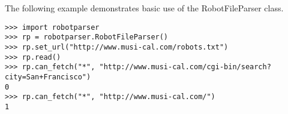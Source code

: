 The following example demonstrates basic use of the RobotFileParser class.

\begin{verbatim}
>>> import robotparser
>>> rp = robotparser.RobotFileParser()
>>> rp.set_url("http://www.musi-cal.com/robots.txt")
>>> rp.read()
>>> rp.can_fetch("*", "http://www.musi-cal.com/cgi-bin/search?city=San+Francisco")
0
>>> rp.can_fetch("*", "http://www.musi-cal.com/")
1
\end{verbatim}
